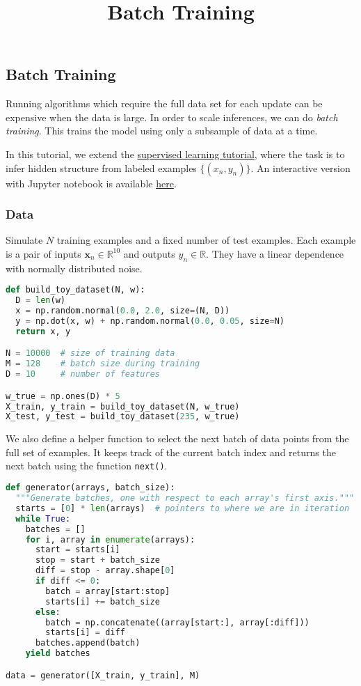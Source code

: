 \title{Batch Training}

\subsection{Batch Training}

Running algorithms which require the full data set for each update
can be expensive when the data is large. In order to scale inferences,
we can do \emph{batch training}. This trains the model using
only a subsample of data at a time.

In this tutorial, we extend the
\href{http://edwardlib.org/tutorials/supervised-regression}
{supervised learning tutorial},
where the task is to infer hidden structure from
labeled examples $\{(x_n, y_n)\}$.
An interactive version with Jupyter notebook is available
\href{http://nbviewer.jupyter.org/github/blei-lab/edward/blob/master/notebooks/batch_training.ipynb}{here}.

\subsubsection{Data}

Simulate $N$ training examples and a fixed number of test examples.
Each example is a pair of inputs $\mathbf{x}_n\in\mathbb{R}^{10}$ and
outputs $y_n\in\mathbb{R}$. They have a linear dependence with
normally distributed noise.

\begin{lstlisting}[language=Python]
def build_toy_dataset(N, w):
  D = len(w)
  x = np.random.normal(0.0, 2.0, size=(N, D))
  y = np.dot(x, w) + np.random.normal(0.0, 0.05, size=N)
  return x, y

N = 10000  # size of training data
M = 128    # batch size during training
D = 10     # number of features

w_true = np.ones(D) * 5
X_train, y_train = build_toy_dataset(N, w_true)
X_test, y_test = build_toy_dataset(235, w_true)
\end{lstlisting}

We also define a helper function to select the next batch of data
points from the full set of examples. It keeps track of the current
batch index and returns the next batch using the function
\texttt{next()}.

\begin{lstlisting}[language=Python]
def generator(arrays, batch_size):
  """Generate batches, one with respect to each array's first axis."""
  starts = [0] * len(arrays)  # pointers to where we are in iteration
  while True:
    batches = []
    for i, array in enumerate(arrays):
      start = starts[i]
      stop = start + batch_size
      diff = stop - array.shape[0]
      if diff <= 0:
        batch = array[start:stop]
        starts[i] += batch_size
      else:
        batch = np.concatenate((array[start:], array[:diff]))
        starts[i] = diff
      batches.append(batch)
    yield batches

data = generator([X_train, y_train], M)
\end{lstlisting}

